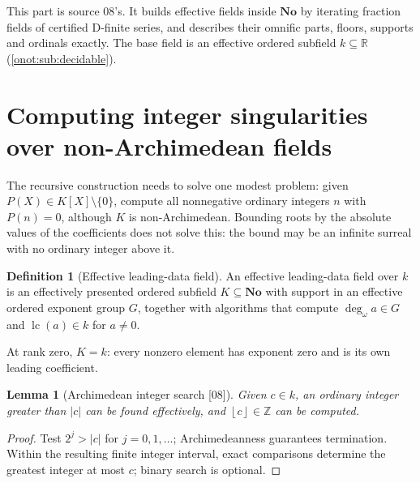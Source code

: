 \documentclass[11pt,oneside]{article}
\numberwithin{equation}{section}
\newtheorem{lemma}[lemma]{Lemma}
\theoremstyle{definition}
\newtheorem{definition}[definition]{Definition}
\theoremstyle{remark}
\newcommand{\No}{\mathbf{No}}
\newcommand{\Z}{\mathbb Z}
\newcommand{\R}{\mathbb R}
\newcommand{\lc}{\operatorname{lc}}
\newcommand{\ddeg}{\operatorname{deg}_{\omega}}
\newcommand{\floor}[1]{\left\lfloor #1\right\rfloor}
\newcommand{\src}[1]{\textup{\textsf{\small[#1]}}}
\begin{document}
This part is source 08's. It builds effective fields inside $\No$ by iterating
fraction fields of certified D-finite series, and describes their omnific parts,
floors, supports and ordinals exactly. The base field is an effective ordered
subfield $k\subseteq\R$ (\cref{onot:sub:decidable}).

\section{Computing integer singularities over non-Archimedean fields}\label{onot:hol:sec:integerroots}

The recursive construction needs to solve one modest problem: given
$P(X)\in K[X]\setminus\{0\}$, compute all nonnegative ordinary integers $n$ with
$P(n)=0$, although $K$ is non-Archimedean. Bounding roots by the absolute values
of the coefficients does not solve this: the bound may be an infinite surreal
with no ordinary integer above it.

\begin{definition}[Effective leading-data field]\label{onot:hol:def:leadingdata}
An effective leading-data field over $k$ is an effectively presented ordered
subfield $K\subseteq\No$ with support in an effective ordered exponent group $G$,
together with algorithms that compute $\ddeg a\in G$ and $\lc(a)\in k$ for
$a\ne0$.
\end{definition}
At rank zero, $K=k$: every nonzero element has exponent zero and is its own
leading coefficient.

\begin{lemma}[Archimedean integer search \src{08}]\label{onot:hol:lem:archsearch}
Given $c\in k$, an ordinary integer greater than $|c|$ can be found effectively,
and $\floor c\in\Z$ can be computed.
\end{lemma}
\begin{proof}
Test $2^j>|c|$ for $j=0,1,\ldots$; Archimedeanness guarantees termination.
Within the resulting finite integer interval, exact comparisons determine the
greatest integer at most $c$; binary search is optional.
\end{proof}
\end{document}
